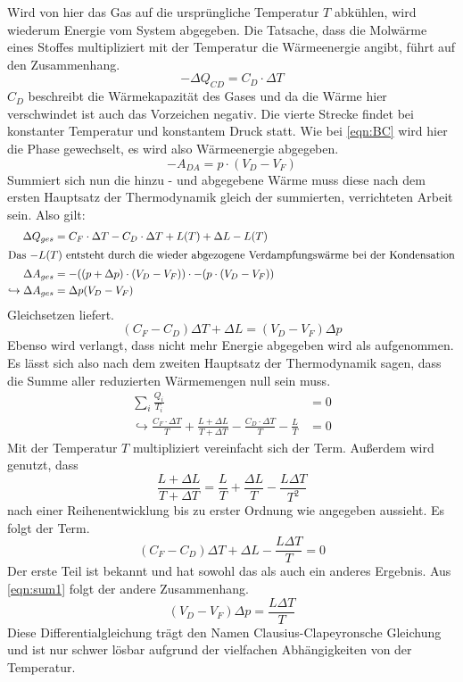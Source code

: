 Wird von hier das Gas auf die ursprüngliche Temperatur $T$ abkühlen, wird wiederum Energie vom System abgegeben.
Die Tatsache, dass die Molwärme eines Stoffes multipliziert mit der Temperatur die Wärmeenergie angibt, führt auf den Zusammenhang.
\begin{equation}
    -\Delta Q_{CD} = C_D \cdot \Delta T
\end{equation}
$C_D$ beschreibt die Wärmekapazität des Gases und da die Wärme hier verschwindet ist auch das Vorzeichen negativ.
Die vierte Strecke findet bei konstanter Temperatur und konstantem Druck statt. Wie bei \eqref{eqn:BC} wird hier die Phase gewechselt, es wird also Wärmeenergie 
abgegeben.
\begin{equation}
    -A_{DA} = p \cdot (V_D - V_F)
\end{equation}
Summiert sich nun die hinzu - und abgegebene Wärme muss diese nach dem ersten Hauptsatz der Thermodynamik gleich der summierten, verrichteten Arbeit sein.
Also gilt:
\begin{align*}
     \Delta Q_{ges} &= C_F \cdot \Delta T - C_D \cdot \Delta T + L(T) + \Delta L - L(T) \\
     \intertext{Das $-L(T)$ entsteht durch die wieder abgezogene Verdampfungswärme bei der Kondensation}
    \Delta A_{ges} &= -((p+ \Delta p) \cdot (V_D-V_F)) \cdot -(p \cdot (V_D - V_F)) \\
    \hookrightarrow \Delta A_{ges} &= \Delta p (V_D - V_F) 
\end{align*}
Gleichsetzen liefert.
\begin{equation}
    \label{eqn:sum1}
    (C_F-C_D)\Delta T + \Delta L = (V_D - V_F) \Delta p
\end{equation}
Ebenso wird verlangt, dass nicht mehr Energie abgegeben wird als aufgenommen. Es lässt sich also nach dem zweiten Hauptsatz der Thermodynamik
sagen, dass die Summe aller reduzierten Wärmemengen null sein muss.
\begin{align}
\label{eqn:sum}
    \sum_i \frac{Q_i}{T_i} &= 0 \\
    \hookrightarrow \frac{C_F \cdot\Delta T}{T} + \frac{L + \Delta L}{T+ \Delta T}-\frac{C_D \cdot \Delta T}{T}-\frac{L}{T} &= 0
\end{align}
Mit der Temperatur $T$ multipliziert vereinfacht sich der Term. Außerdem wird genutzt, dass 
\begin{equation*}
    \frac{L+ \Delta L}{T + \Delta T} = \frac{L}{T} + \frac{\Delta L}{T} - \frac{L \Delta T}{T^2}
\end{equation*}
nach einer Reihenentwicklung bis zu erster Ordnung wie angegeben aussieht. Es folgt der Term.
\begin{equation}
    (C_F - C_D) \Delta T + \Delta L - \frac{L \Delta T}{T} = 0
\end{equation}
Der erste Teil ist bekannt und hat sowohl das als auch ein anderes Ergebnis. Aus \eqref{eqn:sum1} folgt der andere Zusammenhang.
\begin{equation}
    \label{eqn:dgl}
    (V_D-V_F) \Delta p = \frac{L \Delta T}{T}
\end{equation}  
Diese Differentialgleichung trägt den Namen Clausius-Clapeyronsche Gleichung und ist nur schwer lösbar aufgrund der vielfachen Abhängigkeiten von der 
Temperatur.

